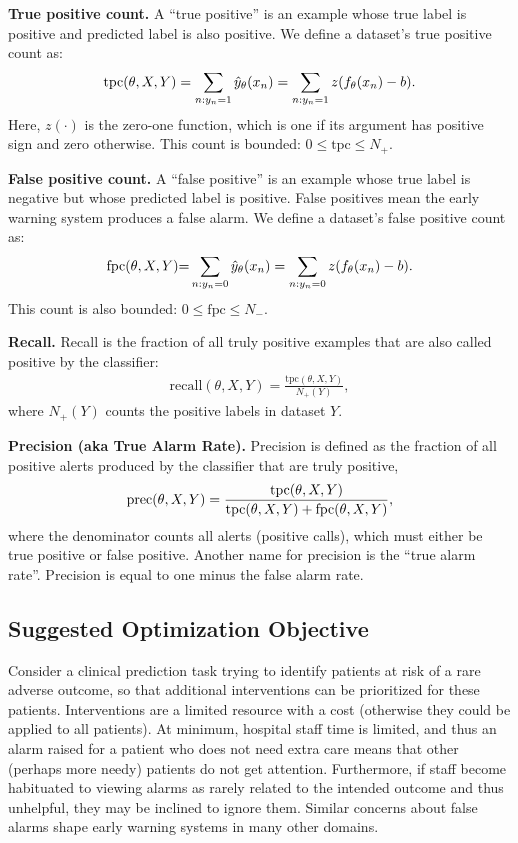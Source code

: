 \textbf{True positive count.} A ``true positive'' is an example whose true label is positive and predicted label is also positive. We define a dataset's true positive count as:
\begin{align}
\text{tpc}(\theta, X, Y) 
	= \sum_{n: y_n=1} \hat{y}_{\theta}(x_n)
	= \sum_{n: y_n=1} z(f_{\theta}(x_n) - b).
	\notag 
\end{align}
Here, $z(\cdot)$ is the zero-one function, which is one if its argument has positive sign and zero otherwise.
This count is bounded: $0 \leq \text{tpc} \leq N_{+}$.

\textbf{False positive count.} A ``false positive'' is an example whose true label is negative but whose predicted label is positive. False positives mean the early warning system produces a false alarm. We define a dataset's false positive count as:
\begin{align}
\text{fpc}(\theta, X, Y)
	{=} \sum_{n : y_n = 0} \hat{y}_{\theta}(x_n)
	= \sum_{n : y_n = 0} z(f_{\theta}(x_n) - b).
	\notag 
\end{align}
This count is also bounded: $0 \leq \text{fpc} \leq N_{-}$.

\textbf{Recall.} Recall is the fraction of all truly positive examples that are also called positive by the classifier:
\begin{align}
\text{recall}(\theta, X, Y) = \frac{\text{tpc}(\theta, X, Y)}{N_+(Y)},
\end{align}
where $N_+(Y)$ counts the positive labels in dataset $Y$.

\textbf{Precision (aka True Alarm Rate).}
Precision is defined as the fraction of all positive alerts produced by the classifier that are truly positive,
\begin{align}
\text{prec}(\theta, X, Y) = \frac{\text{tpc}(\theta, X, Y)}{\text{tpc}(\theta, X, Y) + \text{fpc}(\theta, X, Y)},
\notag
\end{align}
where the denominator counts all alerts (positive calls), which must either be true positive or false positive.
Another name for precision is the ``true alarm rate''. Precision is equal to one minus the false alarm rate.

\subsection{Suggested Optimization Objective}

Consider a clinical prediction task trying to identify patients at risk of a rare adverse outcome, so that additional interventions can be prioritized for these patients.
Interventions are a limited resource with a cost (otherwise they could be applied to all patients).
At minimum, hospital staff time is limited, and thus an alarm raised for a patient who does not need extra care means that other (perhaps more needy) patients do not get attention.
Furthermore, if staff become habituated to viewing alarms as rarely related to the intended outcome and thus unhelpful, they may be inclined to ignore them. Similar concerns about false alarms shape early warning systems in many other domains. 

